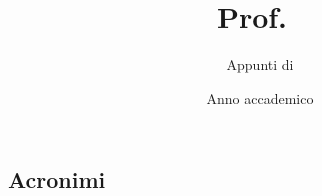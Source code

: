 \documentclass[a4paper,twoside,titlepage]{article}
\title{\sffamily \NomeCorso\\\vspace{6pt}\Large Prof.~\NomeProf\vspace{-8pt}}
\author{\sffamily Appunti di \Autore}
\date{\sffamily Anno accademico \AnnoAccademico}
\begin{document}
\maketitle
\cleardoublepage

\begin{abstract}
\end{abstract}
\cleardoublepage

\tableofcontents
\clearpage



\begin{appendices}
    \section[Acronimi]{Acronimi}
    \printglossary[type=\acronymtype,title={Acronimi}]
\end{appendices}
\end{document}
